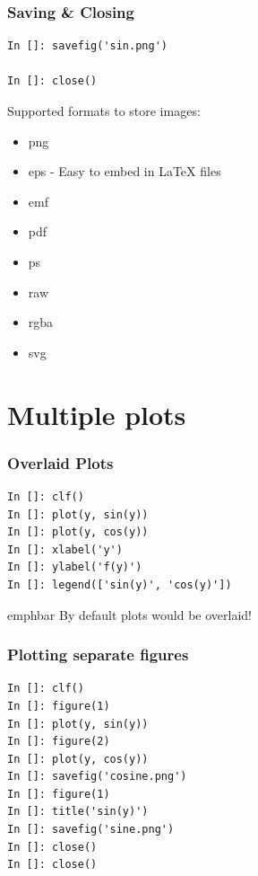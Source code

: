 \documentclass[14pt,compress]{beamer}
\newcommand{\emphbar}[1]
{\begin{beamercolorbox}[rounded=true]{emphbar} 
      {#1}
 \end{beamercolorbox}
}
\newcounter{time}
\newcommand{\inctime}[1]{\addtocounter{time}{#1}{\tiny \thetime\ m}}
\begin{document}

\begin{frame}[fragile]
\frametitle{Saving \& Closing}
\begin{lstlisting}
In []: savefig('sin.png')

In []: close()
\end{lstlisting}
Supported formats to store images:
\begin{itemize}
\item png
\item eps - Easy to embed in LaTeX files
\item emf
\item pdf
\item ps
\item raw
\item rgba
\item svg
\end{itemize}
\end{frame}

\section{Multiple plots}
\begin{frame}[fragile]
\frametitle{Overlaid Plots}
\begin{lstlisting}
In []: clf()
In []: plot(y, sin(y))
In []: plot(y, cos(y))
In []: xlabel('y')
In []: ylabel('f(y)')
In []: legend(['sin(y)', 'cos(y)']) 
\end{lstlisting}
\emphbar{By default plots would be overlaid!}
\end{frame}

\begin{frame}[fragile]
\frametitle{Plotting separate figures}
\begin{lstlisting}
In []: clf()
In []: figure(1)
In []: plot(y, sin(y))
In []: figure(2)
In []: plot(y, cos(y))
In []: savefig('cosine.png')
In []: figure(1)
In []: title('sin(y)')
In []: savefig('sine.png')
In []: close()
In []: close()
\end{lstlisting}
\end{frame}
\end{document}
